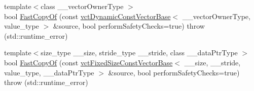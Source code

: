 {\bf }\par
\begin{DoxyCompactItemize}
\item 
{\footnotesize template$<$class \-\_\-\-\_\-vector\-Owner\-Type $>$ }\\bool \hyperlink{classvct_dynamic_vector_base_ad2bbab4a18c78a546aa5e182206f6edb}{Fast\-Copy\-Of} (const \hyperlink{classvct_dynamic_const_vector_base}{vct\-Dynamic\-Const\-Vector\-Base}$<$ \-\_\-\-\_\-vector\-Owner\-Type, value\-\_\-type $>$ \&source, bool perform\-Safety\-Checks=true)  throw (std\-::runtime\-\_\-error)
\item 
{\footnotesize template$<$size\-\_\-type \-\_\-\-\_\-size, stride\-\_\-type \-\_\-\-\_\-stride, class \-\_\-\-\_\-data\-Ptr\-Type $>$ }\\bool \hyperlink{classvct_dynamic_vector_base_a12155c8c505faf9e77a30a0d430f900f}{Fast\-Copy\-Of} (const \hyperlink{classvct_fixed_size_const_vector_base}{vct\-Fixed\-Size\-Const\-Vector\-Base}$<$ \-\_\-\-\_\-size, \-\_\-\-\_\-stride, value\-\_\-type, \-\_\-\-\_\-data\-Ptr\-Type $>$ \&source, bool perform\-Safety\-Checks=true)  throw (std\-::runtime\-\_\-error)
\end{DoxyCompactItemize}

